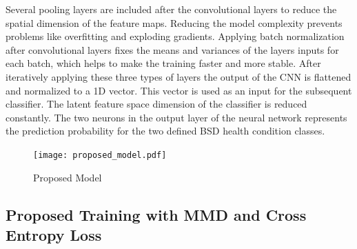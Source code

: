 Several pooling layers are included after the convolutional layers to reduce the spatial dimension of the feature maps. Reducing the model complexity prevents problems like overfitting and exploding gradients. Applying batch normalization after convolutional layers fixes the means and variances of the layers inputs for each batch, which helps to make the training faster and more stable. After iteratively applying these three types of layers the output of the CNN is flattened and normalized to a 1D vector. This vector is used as an input for the subsequent classifier. The latent feature space dimension of the classifier is reduced constantly. The two neurons in the output layer of the neural network represents the prediction probability for the two defined BSD health condition classes.


\begin{figure}[H]
  \centering
  \texttt{[image: proposed\_model.pdf]}
  \caption {Proposed Model} \label{fig:proposed_model}
\end{figure}


\subsection{Proposed Training with MMD and Cross Entropy Loss} \label{sec:Proposed_training}

